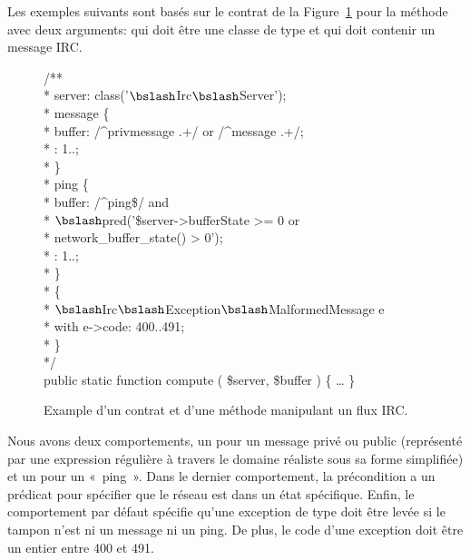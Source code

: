 Les exemples suivants sont basés sur le contrat de la
Figure~\ref{figure:test:irc} pour la méthode  avec deux arguments:
 qui doit être une classe de type
 et  qui doit contenir un message
IRC.
%
\begin{figure}

\begin{bigpre}
/** \\
 * \arequires server: class('\(\bslash\)Irc\(\bslash\)Server'); \\
 * \abehavior message \{ \\
 *     \arequires buffer: /^privmessage .+/ or /^message .+/; \\
 *     \aensures  \aresult: 1..; \\
 * \} \\
 * \abehavior ping \{ \\
 *     \arequires buffer: /^ping\$/ and \\
 *               \(\bslash\)pred('\$server->bufferState   >= 0 or \\
 *                      network\_buffer\_state() >  0'); \\
 *     \aensures  \aresult: 1..; \\
 * \} \\
 * \adefault \{ \\
 *     \athrowable \(\bslash\)Irc\(\bslash\)Exception\(\bslash\)MalformedMessage e \\
 *                    with e->code: 400..491; \\
 * \} \\
 */ \\
public static function compute ( \$server, \$buffer ) \{ … \}
\end{bigpre}

\caption{\label{figure:test:irc} Example d'un contrat et d'une méthode
manipulant un flux IRC.}

\end{figure}
%
Nous avons deux comportements, un pour un message privé ou public (représenté
par une expression régulière à travers le domaine réaliste  sous sa
forme simplifiée) et un pour un «~ping~». Dans le dernier comportement, la
précondition a un prédicat pour spécifier que le réseau est dans un état
spécifique. Enfin, le comportement par défaut spécifie qu'une exception de type
 doit être levée
si le tampon n'est ni un message ni un ping. De plus, le code d'une exception
doit être un entier entre 400 et 491.

